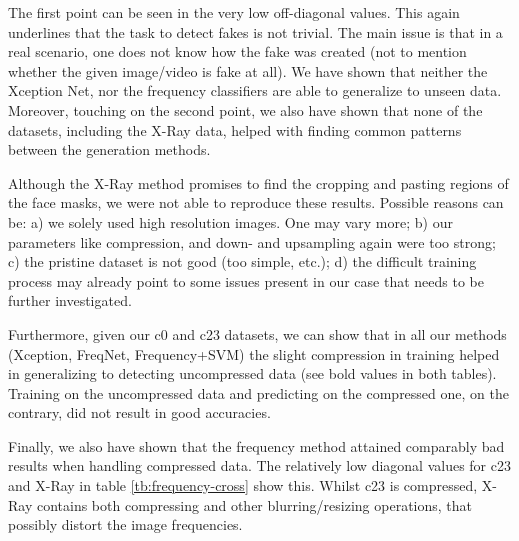 \documentclass[11pt]{article}
\begin{document}
The first point can be seen in the very low off-diagonal values. This again underlines that the task to detect fakes is not trivial. The main issue is that in a real scenario, one does not know how the fake was created (not to mention whether the given image/video is fake at all). We have shown that neither the Xception Net, nor the frequency classifiers are able to generalize to unseen data. Moreover, touching on the second point, we also have shown that none of the datasets, including the X-Ray data, helped with finding common patterns between the generation methods.


Although the X-Ray method promises to find the cropping and pasting regions of the face masks, we were not able to reproduce these results. Possible reasons can be: a) we solely used high resolution images. One may vary more; b) our parameters like compression, and down- and upsampling again were too strong; c) the pristine dataset is not good (too simple, etc.); d) the difficult training process may already point to some issues present in our case that needs to be further investigated.

Furthermore, given our c0 and c23 datasets, we can show that in all our methods (Xception, FreqNet, Frequency+SVM) the slight compression in training helped in generalizing to detecting uncompressed data (see bold values in both tables). Training on the uncompressed data and predicting on the compressed one, on the contrary, did not result in good accuracies.

Finally, we also have shown that the frequency method attained comparably bad results when handling compressed data. The relatively low diagonal values for c23 and X-Ray in table \ref{tb:frequency-cross} show this. Whilst c23 is compressed, X-Ray contains both compressing and other blurring/resizing operations, that possibly distort the image frequencies.
\end{document}
